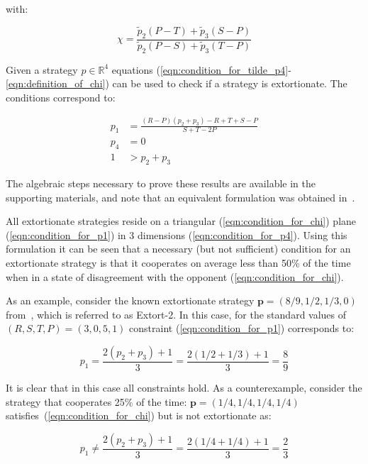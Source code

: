 \documentclass[a4paper]{article}
\begin{document}
with:

\begin{equation}\label{eqn:definition_of_chi}
    \chi = \frac{\tilde p_2 (P - T) + \tilde p_3 (S - P)}
                {\tilde p_2 (P - S) + \tilde p_3 (T - P)}
\end{equation}

Given a strategy \(p\in\mathbb{R}^{4}\) equations
(\ref{eqn:condition_for_tilde_p4}-\ref{eqn:definition_of_chi}) can be used to
check if a strategy is extortionate. The conditions correspond to:

\begin{align}
    p_1 & = \frac{(R-P)(p_2 + p_3) - R + T + S - P}{S + T - 2P}
     \label{eqn:condition_for_p1}\\
    p_4 & = 0 \label{eqn:condition_for_p4}\\
    1 & > p_2 + p_3\label{eqn:condition_for_chi}
\end{align}

The algebraic steps necessary to prove these results are available in the
supporting materials, and note that an equivalent formulation was obtained
in~\cite{adami2013evolutionary}.

All extortionate strategies reside on a triangular (\ref{eqn:condition_for_chi})
plane (\ref{eqn:condition_for_p1}) in 3 dimensions (\ref{eqn:condition_for_p4}).
Using this formulation it can be seen that a necessary (but not sufficient)
condition for an extortionate strategy is that it cooperates on average less
than 50\% of the time when in a state of disagreement with the opponent
(\ref{eqn:condition_for_chi}).

As an example, consider the known extortionate strategy \(\textbf{p}=(8 / 9, 1 / 2, 1 /
3, 0)\) from~\cite{Stewart2012}, which is referred to as Extort-2. In
this case, for the standard values of \((R, S, T, P) = (3, 0, 5, 1)\)
constraint (\ref{eqn:condition_for_p1}) corresponds to:

\begin{equation}
    p_1 = \frac{2(p_2 + p_3) + 1}{3}
        = \frac{2(1 / 2 + 1 / 3) + 1}{3}
        = \frac{8}{9}
\end{equation}

It is clear that in this case all constraints hold. As a counterexample,
consider the strategy that cooperates 25\% of the time: \(\textbf{p}=(1 /4, 1 / 4, 1 / 4,
1 / 4)\) satisfies~(\ref{eqn:condition_for_chi}) but is not extortionate as:

\begin{equation}
    p_1 \ne \frac{2(p_2 + p_3) + 1}{3}
        = \frac{2(1 / 4 + 1 / 4) + 1}{3}
        = \frac{2}{3}
\end{equation}
\end{document}
